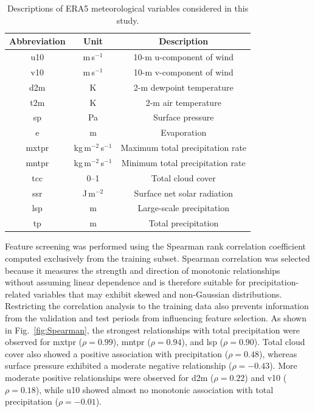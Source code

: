 \documentclass[referee,pdflatex,sn-basic]{sn-jnl}%
\theoremstyle{thmstyleone}%
\theoremstyle{thmstyletwo}%
\theoremstyle{thmstylethree}%
\begin{document}
\begin{table}[htbp]
\centering
\caption{Descriptions of ERA5 meteorological variables considered in this study.}
\label{tab:variables}

\small
\setlength{\tabcolsep}{6pt}

\begin{tabular}{@{}ccc@{}}
\hline
\textbf{Abbreviation} & \textbf{Unit} & \textbf{Description} \\
\hline

u10    & m\,s$^{-1}$              & 10-m u-component of wind \\
v10    & m\,s$^{-1}$              & 10-m v-component of wind \\
d2m    & K                        & 2-m dewpoint temperature \\
t2m    & K                        & 2-m air temperature \\
sp     & Pa                       & Surface pressure \\
e      & m                        & Evaporation \\
mxtpr  & kg\,m$^{-2}$\,s$^{-1}$  & Maximum total precipitation rate \\
mntpr  & kg\,m$^{-2}$\,s$^{-1}$  & Minimum total precipitation rate \\
tcc    & 0--1                     & Total cloud cover \\
ssr    & J\,m$^{-2}$              & Surface net solar radiation \\
lsp    & m                        & Large-scale precipitation \\
tp     & m                        & Total precipitation \\

\hline
\end{tabular}
\end{table}

Feature screening was performed using the Spearman rank correlation coefficient computed exclusively from the training subset. Spearman correlation was selected because it measures the strength and direction of monotonic relationships without assuming linear dependence and is therefore suitable for precipitation-related variables that may exhibit skewed and non-Gaussian distributions. Restricting the correlation analysis to the training data also prevents information from the validation and test periods from influencing feature selection. As shown in Fig.~\ref{fig:Spearman}, the strongest relationships with total precipitation were observed for mxtpr ($\rho=0.99$), mntpr ($\rho=0.94$), and lsp ($\rho=0.90$). Total cloud cover also showed a positive association with precipitation ($\rho=0.48$), whereas surface pressure exhibited a moderate negative relationship ($\rho=-0.43$). More moderate positive relationships were observed for d2m ($\rho=0.22$) and v10 ($\rho=0.18$), while u10 showed almost no monotonic association with total precipitation ($\rho=-0.01$).
\end{document}
